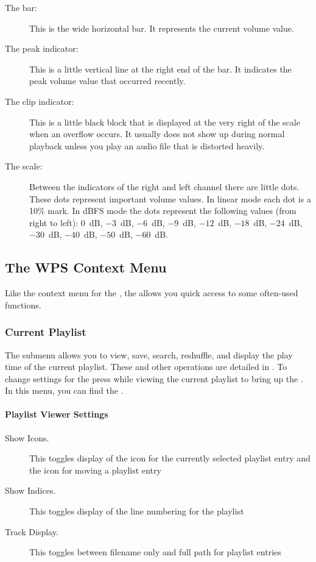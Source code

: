 \begin{description}
\item [The bar:]
  This is the wide horizontal bar. It represents the current volume value.
\item [The peak indicator:]
  This is a little vertical line at the right end of the bar. It indicates
  the peak volume value that occurred recently.
\item [The clip indicator:]
  This is a little black block that is displayed at the very right of the
  scale when an overflow occurs. It usually does not show up during normal
  playback unless you play an audio file that is distorted heavily.
\item [The scale:]
  Between the indicators of the right and left channel there are little dots.
  These dots represent important volume values. In linear mode each dot is a
  10\% mark. In dBFS mode the dots represent the following values (from right
  to left): 0~dB, $-3$~dB, $-6$~dB, $-9$~dB, $-12$~dB, $-18$~dB, $-24$~dB, $-30$~dB,
  $-40$~dB, $-50$~dB, $-60$~dB.
\end{description}

\subsection{\label{sec:contextmenu}The WPS Context Menu}
Like the context menu for the , the 
allows you quick access to some often-used functions.

\subsubsection{Current Playlist}
The  submenu allows you to view, save, search, reshuffle,
and display the play time of the current playlist. These and other operations
are detailed in . To change settings for
the  press \ActionStdContext{} while viewing the
current playlist to bring up the . In this
menu, you can find the .

\paragraph{Playlist Viewer Settings}
  \begin{description}
    \item[Show Icons.] This toggles display of the icon for the currently
    selected playlist entry and the icon for moving a playlist entry
    \item[Show Indices.] This toggles display of the line numbering for
       the playlist
    \item[Track Display.] This toggles between filename only and full path
       for playlist entries
  \end{description}


